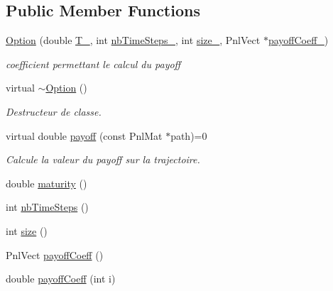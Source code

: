 \subsection*{Public Member Functions}
\begin{DoxyCompactItemize}
\item 
\hyperlink{classOption_ad64e6f411a0e0ba09e0179adfb6fc88d}{Option} (double \hyperlink{classOption_a89f0365b68626cc5eb523f12159e0764}{T\-\_\-}, int \hyperlink{classOption_ad424223ea2698144e823c494d625fbe0}{nb\-Time\-Steps\-\_\-}, int \hyperlink{classOption_a65fae5103b50f953f29a86b1a17b4540}{size\-\_\-}, Pnl\-Vect $\ast$\hyperlink{classOption_ae39676c75e7c6592cfcead8abe48b71b}{payoff\-Coeff\-\_\-})
\begin{DoxyCompactList}\small\item\em coefficient permettant le calcul du payoff \end{DoxyCompactList}\item 
virtual \hyperlink{classOption_a04b908a0ba9b1909ae378ca2a07fda61}{$\sim$\-Option} ()
\begin{DoxyCompactList}\small\item\em Destructeur de classe. \end{DoxyCompactList}\item 
virtual double \hyperlink{classOption_abe90882a11f5436077425249e3f32204}{payoff} (const Pnl\-Mat $\ast$path)=0
\begin{DoxyCompactList}\small\item\em Calcule la valeur du payoff sur la trajectoire. \end{DoxyCompactList}\item 
double \hyperlink{classOption_a4307b0dcca6321e0c060abba6a8f4a88}{maturity} ()
\item 
int \hyperlink{classOption_aa170acf6857ed21495c62ab1599f60ae}{nb\-Time\-Steps} ()
\item 
int \hyperlink{classOption_a58d0f66b495003ab29bf0b543ecbe450}{size} ()
\item 
Pnl\-Vect \hyperlink{classOption_aeacd619d109d09331a1fb212b92079ad}{payoff\-Coeff} ()
\item 
double \hyperlink{classOption_a36728dd2492eb49082880d0ef8afe545}{payoff\-Coeff} (int i)
\end{DoxyCompactItemize}
